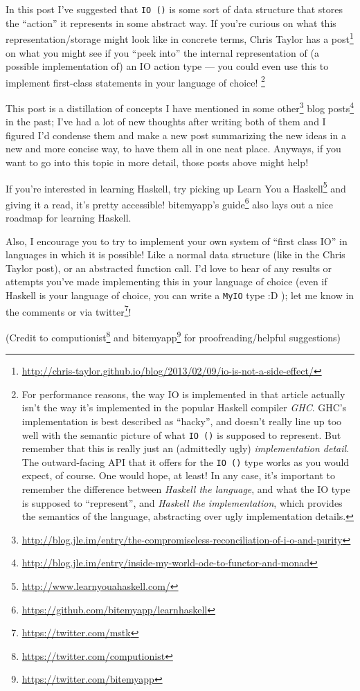\documentclass[]{article}
\renewcommand{\href}[2]{#2\footnote{\url{#1}}}
\begin{document}
In this post I've suggested that \texttt{IO\ ()} is some sort of data structure
that stores the ``action'' it represents in some abstract way. If you're curious
on what this representation/storage might look like in concrete terms,
\href{http://chris-taylor.github.io/blog/2013/02/09/io-is-not-a-side-effect/}{Chris
Taylor has a post} on what you might see if you ``peek into'' the internal
representation of (a possible implementation of) an IO action type --- you could
even use this to implement first-class statements in your language of choice!
\footnote{For performance reasons, the way IO is implemented in that article
  actually isn't the way it's implemented in the popular Haskell compiler
  \emph{GHC}. GHC's implementation is best described as ``hacky'', and doesn't
  really line up too well with the semantic picture of what \texttt{IO\ ()} is
  supposed to represent. But remember that this is really just an (admittedly
  ugly) \emph{implementation detail}. The outward-facing API that it offers for
  the \texttt{IO\ ()} type works as you would expect, of course. One would hope,
  at least! In any case, it's important to remember the difference between
  \emph{Haskell the language}, and what the IO type is supposed to
  ``represent'', and \emph{Haskell the implementation}, which provides the
  semantics of the language, abstracting over ugly implementation details.}

This post is a distillation of concepts I have mentioned in
\href{http://blog.jle.im/entry/the-compromiseless-reconciliation-of-i-o-and-purity}{some
other}
\href{http://blog.jle.im/entry/inside-my-world-ode-to-functor-and-monad}{blog
posts} in the past; I've had a lot of new thoughts after writing both of them
and I figured I'd condense them and make a new post summarizing the new ideas in
a new and more concise way, to have them all in one neat place. Anyways, if you
want to go into this topic in more detail, those posts above might help!

If you're interested in learning Haskell, try picking up
\href{http://www.learnyouahaskell.com/}{Learn You a Haskell} and giving it a
read, it's pretty accessible!
\href{https://github.com/bitemyapp/learnhaskell}{bitemyapp's guide} also lays
out a nice roadmap for learning Haskell.

Also, I encourage you to try to implement your own system of ``first class IO''
in languages in which it is possible! Like a normal data structure (like in the
Chris Taylor post), or an abstracted function call. I'd love to hear of any
results or attempts you've made implementing this in your language of choice
(even if Haskell is your language of choice, you can write a \texttt{MyIO} type
:D ); let me know in the comments or via
\href{https://twitter.com/mstk}{twitter}!

(Credit to \href{https://twitter.com/computionist}{computionist} and
\href{https://twitter.com/bitemyapp}{bitemyapp} for proofreading/helpful
suggestions)
\end{document}

